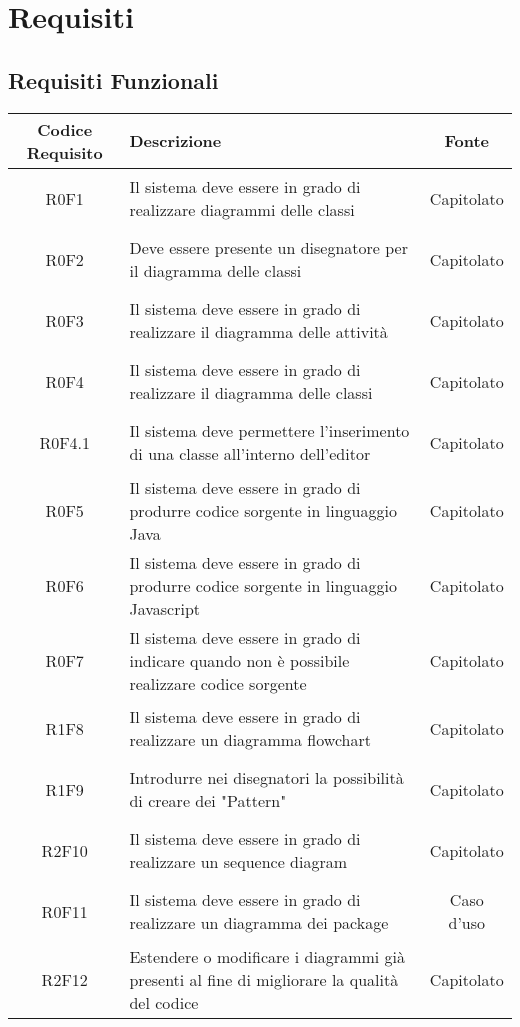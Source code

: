 \documentclass[../AnalisiDeiRequisiti.tex]{subfiles}
\begin{document}
\section{Requisiti}
\subsection{Requisiti Funzionali}
\normalsize
\begin{longtable}{|c|>{\centering}p{7cm}|c|}
	\hline
	\textbf{Codice Requisito} & \textbf{Descrizione} & \textbf{Fonte}\\
	\hline
	\endhead
	\hypertarget{R0F1}{R0F1} & Il sistema deve essere in grado di realizzare diagrammi delle classi & Capitolato \\ \hline
	\hypertarget{R0F2}{R0F2} & Deve essere presente un disegnatore per il diagramma delle classi & Capitolato \\ \hline
	\hypertarget{R0F3}{R0F3} & Il sistema deve essere in grado di realizzare il diagramma delle attività & Capitolato \\ \hline
	\hypertarget{R0F4}{R0F4} & Il sistema deve essere in grado di realizzare il diagramma delle classi & Capitolato \\ \hline
	\hypertarget{R0F4.1}{R0F4.1} & Il sistema deve permettere l'inserimento di una classe all'interno dell'editor & Capitolato \\ \hline
	\hypertarget{R0F5}{R0F5} & Il sistema deve essere in grado di produrre codice sorgente in linguaggio Java & Capitolato \\ \hline
	\hypertarget{R0F6}{R0F6} & Il sistema deve essere in grado di produrre codice sorgente in linguaggio Javascript & Capitolato \\ \hline
	\hypertarget{R0F7}{R0F7} & Il sistema deve essere in grado di indicare quando non è possibile realizzare codice sorgente & Capitolato \\ \hline
	\hypertarget{R1F8}{R1F8} & Il sistema deve essere in grado di realizzare un diagramma flowchart & Capitolato \\ \hline
	\hypertarget{R1F9}{R1F9} & Introdurre nei disegnatori la possibilità di creare dei "Pattern" & Capitolato \\ \hline
	\hypertarget{R2F10}{R2F10} & Il sistema deve essere in grado di realizzare un sequence diagram & Capitolato \\ \hline
	\hypertarget{R0F11}{R0F11} & Il sistema deve essere in grado di realizzare un diagramma dei package & Caso d'uso \\ \hline
	\hypertarget{R2F12}{R2F12} & Estendere o modificare i diagrammi già presenti al fine di migliorare la qualità del codice & Capitolato \\ \hline

\end{longtable}
\end{document}
